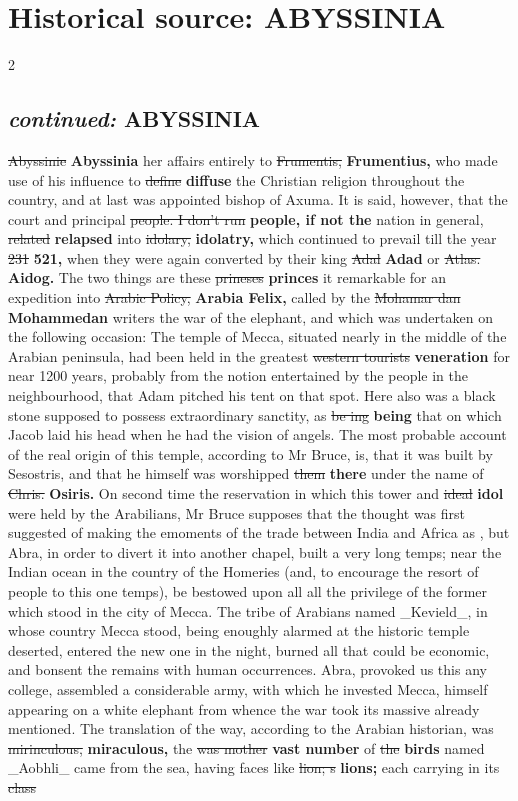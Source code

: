 \documentclass[10pt]{article}
\begin{document}
\section*{Historical source: ABYSSINIA}
\begin{multicols}{2}
\subsection*{\textit{continued:} ABYSSINIA}
\sout{Abyssinie} \textbf{Abyssinia} her affairs entirely to \sout{Frumentis,} \textbf{Frumentius,} who made use of his influence to \sout{define} \textbf{diffuse} the Christian religion throughout the country, and at last was appointed bishop of Axuma. It is said, however, that the court and principal \sout{people. I don’t run} \textbf{people, if not the} nation in general, \sout{related} \textbf{relapsed} into \sout{idolary,} \textbf{idolatry,} which continued to prevail till the year \sout{231} \textbf{521,} when they were again converted by their king \sout{Adal} \textbf{Adad} or \sout{Atlas.} \textbf{Aidog.} The two things are these \sout{prineses} \textbf{princes} it remarkable for an expedition into \sout{Arabic Policy,} \textbf{Arabia Felix,} called by the \sout{Mohamar dan} \textbf{Mohammedan} writers the war of the elephant, and which was undertaken on the following occasion: The temple of Mecca, situated nearly in the middle of the Arabian peninsula, had been held in the greatest \sout{western tourists} \textbf{veneration} for near 1200 years, probably from the notion entertained by the people in the neighbourhood, that Adam pitched his tent on that spot. Here also was a black stone supposed to possess extraordinary sanctity, as \sout{be ing} \textbf{being} that on which Jacob laid his head when he had the vision of angels. The most probable account of the real origin of this temple, according to Mr Bruce, is, that it was built by Sesostris, and that he himself was worshipped \sout{them} \textbf{there} under the name of \sout{Chris.} \textbf{Osiris.} On second time the reservation in which this tower and \sout{ideal} \textbf{idol} were held by the Arabilians, Mr Bruce supposes that the thought was first suggested of making the emoments of the trade between India and Africa as , but Abra, in order to divert it into another chapel, built a very long temps; near the Indian ocean in the country of the Homeries (and, to encourage the resort of people to this one temps), be bestowed upon all all the privilege of the former which stood in the city of Mecca. The tribe of Arabians named \_Kevield\_, in whose country Mecca stood, being enoughly alarmed at the historic temple deserted, entered the new one in the night, burned all that could be economic, and bonsent the remains with human occurrences. Abra, provoked us this any college, assembled a considerable army, with which he invested Mecca, himself appearing on a white elephant from whence the war took its massive already mentioned. The translation of the way, according to the Arabian historian, was \sout{mirinculous,} \textbf{miraculous,} the \sout{was mother} \textbf{vast number} of \sout{the} \textbf{birds} named \_Aobhli\_ came from the sea, having faces like \sout{lion; s} \textbf{lions;} each carrying in its \sout{class} 
\end{multicols}
\end{document}
